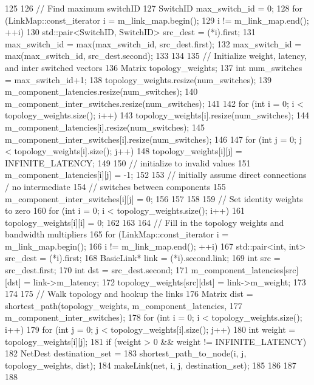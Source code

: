 \begin{DoxyCode}
125 {
126     // Find maximum switchID
127     SwitchID max_switch_id = 0;
128     for (LinkMap::const_iterator i = m_link_map.begin();
129          i != m_link_map.end(); ++i) {
130         std::pair<SwitchID, SwitchID> src_dest = (*i).first;
131         max_switch_id = max(max_switch_id, src_dest.first);
132         max_switch_id = max(max_switch_id, src_dest.second);        
133     }
134 
135     // Initialize weight, latency, and inter switched vectors
136     Matrix topology_weights;
137     int num_switches = max_switch_id+1;
138     topology_weights.resize(num_switches);
139     m_component_latencies.resize(num_switches);
140     m_component_inter_switches.resize(num_switches);
141 
142     for (int i = 0; i < topology_weights.size(); i++) {
143         topology_weights[i].resize(num_switches);
144         m_component_latencies[i].resize(num_switches);
145         m_component_inter_switches[i].resize(num_switches);
146 
147         for (int j = 0; j < topology_weights[i].size(); j++) {
148             topology_weights[i][j] = INFINITE_LATENCY;
149 
150             // initialize to invalid values
151             m_component_latencies[i][j] = -1;
152 
153             // initially assume direct connections / no intermediate
154             // switches between components
155             m_component_inter_switches[i][j] = 0;
156         }
157     }
158 
159     // Set identity weights to zero
160     for (int i = 0; i < topology_weights.size(); i++) {
161         topology_weights[i][i] = 0;
162     }
163 
164     // Fill in the topology weights and bandwidth multipliers
165     for (LinkMap::const_iterator i = m_link_map.begin();
166          i != m_link_map.end(); ++i) {
167         std::pair<int, int> src_dest = (*i).first;
168         BasicLink* link = (*i).second.link;
169         int src = src_dest.first;
170         int dst = src_dest.second;
171         m_component_latencies[src][dst] = link->m_latency;
172         topology_weights[src][dst] = link->m_weight;
173     }
174         
175     // Walk topology and hookup the links
176     Matrix dist = shortest_path(topology_weights, m_component_latencies,
177         m_component_inter_switches);
178     for (int i = 0; i < topology_weights.size(); i++) {
179         for (int j = 0; j < topology_weights[i].size(); j++) {
180             int weight = topology_weights[i][j];
181             if (weight > 0 && weight != INFINITE_LATENCY) {
182                 NetDest destination_set =
183                         shortest_path_to_node(i, j, topology_weights, dist);
184                 makeLink(net, i, j, destination_set);
185             }
186         }
187     }
188 }
\end{DoxyCode}
